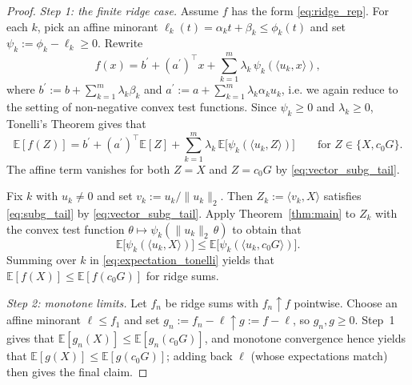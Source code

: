 \documentclass[11pt]{article}
\newcommand{\Ebb}{\mathbb{E}}
\begin{document}
\begin{proof}
\emph{Step 1: the finite ridge case.}
Assume $f$ has the form \eqref{eq:ridge_rep}.
For each $k$, pick an affine minorant $\ell_k(t) = \alpha_k t + \beta_k \le \phi_k (t)$ and set $\psi_k := \phi_k-\ell_k \ge 0$.
Rewrite
%
\[
f(x) = b^{\prime}+(a^{\prime})^\top x + \sum_{k=1}^m \lambda_k \, \psi_k (\langle u_k, x \rangle),
\]
%
where $b^{\prime} := b + \sum_{k=1}^m \lambda_k\beta_k$ and $a^{\prime} := a + \sum_{k=1}^m \lambda_k \alpha_k u_k$, i.e. we again reduce to the setting of non-negative convex test functions.
Since $\psi_k\ge 0$ and $\lambda_k\ge 0$, Tonelli's Theorem gives that
%
\begin{equation}
\label{eq:expectation_tonelli}
\Ebb[f (Z)]
= b^{\prime} + (a^{\prime})^\top \Ebb[Z] + \sum_{k=1}^m \lambda_k \, \Ebb \big[\psi_k (\langle u_k, Z \rangle )\big]
\qquad \text{for } Z \in \{X, c_0 G\}.
\end{equation}
%
The affine term vanishes for both $Z = X$ and $Z = c_0G$ by \eqref{eq:vector_subg_tail}.

Fix $k$ with $u_k \ne 0$ and set $v_k := u_k / \|u_k\|_2$.
Then $Z_k := \langle v_k, X\rangle$ satisfies \eqref{eq:subg_tail} by \eqref{eq:vector_subg_tail}.
Apply Theorem~\ref{thm:main} to $Z_k$ with the convex test function $\theta \mapsto \psi_k( \|u_k\|_2\, \theta)$ to obtain that
%
\[
\Ebb \big[ \psi_k (\langle u_k, X \rangle) \big] \le \Ebb \big[ \psi_k(\langle u_k, c_0 G \rangle) \big].
\]
%
Summing over $k$ in \eqref{eq:expectation_tonelli} yields that $\Ebb [f (X)] \le \Ebb[f (c_0 G)]$ for ridge sums.

\smallskip
\emph{Step 2: monotone limits.}
Let $f_n$ be ridge sums with $f_n\uparrow f$ pointwise.
Choose an affine minorant $\ell \le f_1$ and set $g_n := f_n-\ell \uparrow g := f - \ell$, so $g_n, g \ge 0$.
Step~1 gives that $\Ebb [g_n (X)] \le \Ebb [g_n (c_0 G)]$, and monotone convergence hence yields that $\Ebb [g (X)] \le \Ebb [g (c_0 G)]$; adding back $\ell$ (whose expectations match) then gives the final claim.
\end{proof}



\end{document}
